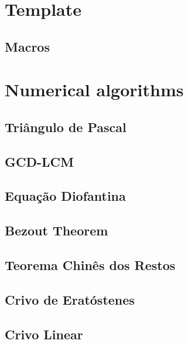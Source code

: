 \section{Template}
\subsection{Macros}
\raggedbottom
\hrulefill

\section{Numerical algorithms}
\subsection{Triângulo de Pascal}
\raggedbottom
\hrulefill
\subsection{GCD-LCM}
\raggedbottom
\hrulefill
\subsection{Equação Diofantina}
\raggedbottom
\hrulefill
\subsection{Bezout Theorem}
\raggedbottom
\hrulefill
\subsection{Teorema Chinês dos Restos}
\raggedbottom
\hrulefill
\subsection{Crivo de Eratóstenes}
\raggedbottom
\hrulefill
\subsection{Crivo Linear}
\raggedbottom
\hrulefill
